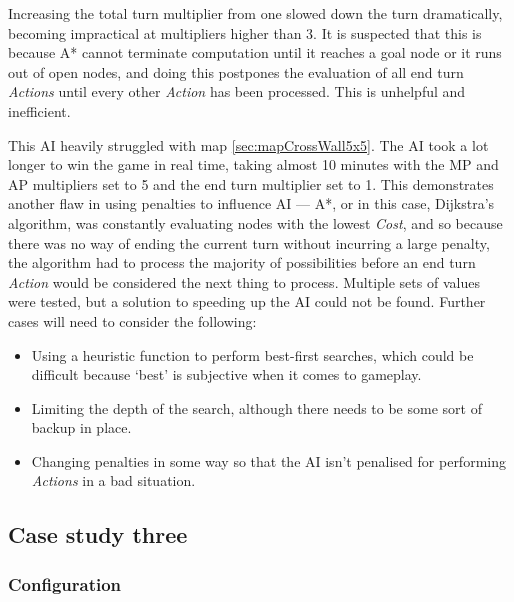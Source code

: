 \documentclass[11pt, a4paper]{report}
\begin{document}
Increasing the total turn multiplier from one slowed down the turn dramatically, becoming impractical at multipliers higher than 3. It is suspected that this is because A* cannot terminate computation until it reaches a goal node or it runs out of open nodes, and doing this postpones the evaluation of all end turn \emph{Actions} until every other \emph{Action} has been processed. This is unhelpful and inefficient.

This AI heavily struggled with map \ref{sec:mapCrossWall5x5}. The AI took a lot longer to win the game in real time, taking almost 10 minutes with the MP and AP multipliers set to 5 and the end turn multiplier set to 1. This demonstrates another flaw in using penalties to influence AI --- A*, or in this case, Dijkstra's algorithm, was constantly evaluating nodes with the lowest \emph{Cost}, and so because there was no way of ending the current turn without incurring a large penalty, the algorithm had to process the majority of possibilities before an end turn \emph{Action} would be considered the next thing to process. Multiple sets of values were tested, but a solution to speeding up the AI could not be found. Further cases will need to consider the following: 

\begin{itemize}
  \item Using a heuristic function to perform best-first searches, which could be difficult because `best' is subjective when it comes to gameplay.
  \item Limiting the depth of the search, although there needs to be some sort of backup in place.
  \item Changing penalties in some way so that the AI isn't penalised for performing \emph{Actions} in a bad situation.
\end{itemize}

\subsection{Case study three}
\label{subsec:caseStudyThree}

\subsubsection{Configuration}
\end{document}
